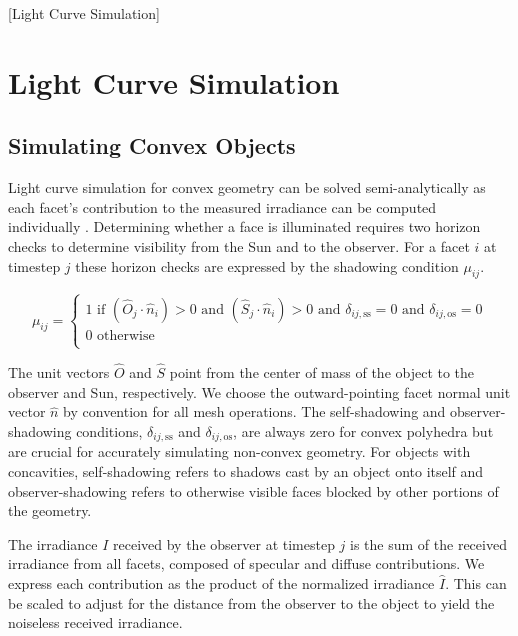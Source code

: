 [Light Curve Simulation]

\chapter{Light Curve Simulation}

\section{Simulating Convex Objects}

Light curve simulation for convex geometry can be solved semi-analytically as each facet's contribution 
to the measured irradiance can be computed individually \cite{kaasalainen2001}. 
Determining whether a face is illuminated requires two horizon checks to determine visibility 
from the Sun and to the observer. For a facet $i$ at timestep $j$ these horizon checks are 
expressed by the shadowing condition $\mu_{ij}$. 

\begin{equation} \label{eq:cvx_shadow_cond}
  \mu_{ij} = \begin{cases}
    1 \text{ if } \left( \hat{O}_j \cdot \hat{n}_i \right) > 0 \text{ and } \left( \hat{S}_j \cdot \hat{n}_i \right) > 0 
	  \text{ and } \delta_{ij,\text{ss}} = 0 \text{ and } \delta_{ij,\text{os}} = 0\\
    0 \text{ otherwise } \\
  \end{cases}
\end{equation}

The unit vectors $\hat{O}$ and $\hat{S}$ point from the  center of mass of the object to the observer and Sun, respectively. 
We choose the outward-pointing facet normal unit vector $\hat{n}$ by convention for all mesh operations. 
The self-shadowing and observer-shadowing conditions, $\delta_{ij,\text{ss}}$ and $\delta_{ij,\text{os}}$, 
are always zero for convex polyhedra but are crucial for accurately simulating non-convex geometry. 
For objects with concavities, self-shadowing refers to shadows cast by an object onto itself and observer-shadowing 
refers to otherwise visible faces blocked by other portions of the geometry.

The irradiance $I$ received by the observer at timestep $j$ is the sum of the received irradiance from all facets, 
composed of specular and diffuse contributions. We express each contribution as the product of the
normalized irradiance $\hat{I}$. This can be scaled to adjust for the distance from the observer to
the object to yield the noiseless received irradiance.

